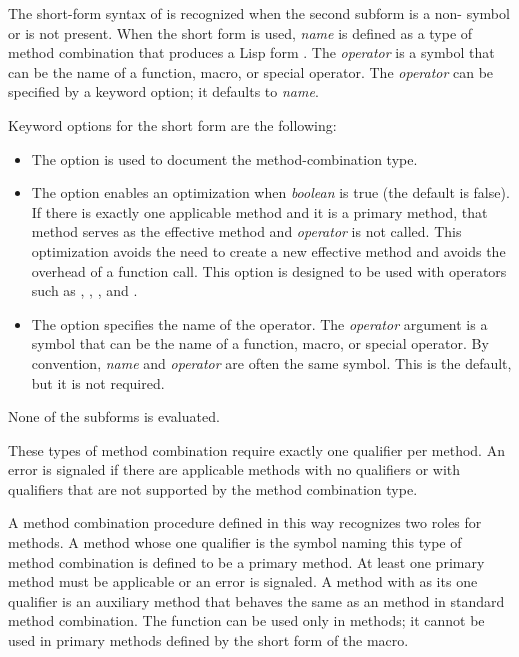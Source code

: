 \begin{defmac}
\medskip

The short-form syntax of  is recognized
when the second subform is a non- symbol or is not present.
When the short form is used, \emph{name\/} is defined as a type of
method combination that produces a Lisp form .  The \emph{operator\/} is a symbol
that can be the name of a function, macro, or special operator.  The
\emph{operator\/} can be specified by a keyword option; it defaults to {\it
name}.

Keyword options for the short form are the following:

\begin{itemize}

\item 
The  option is used to document the method-combination type.

\item 
The  option enables an optimization
when \emph{boolean\/} is true (the default is false).  If there is
exactly one applicable method and it is a primary method, that method
serves as the effective method and \emph{operator\/} is not called.
This optimization avoids the need to create a new effective method and
avoids the overhead of a function call.  This option is designed to be
used with operators such as , , \cdf{+}, and
.

\item 
The  option specifies the name of the operator.  The
\emph{operator\/} argument is a symbol that can be the name of a
function, macro, or special operator.  By convention, \emph{name\/} and
\emph{operator\/} are often the same symbol.  This is the default,
but it is not required.

\end{itemize}

None of the subforms is evaluated.

These types of method combination require exactly one qualifier per
method.  An error is signaled if there are applicable methods with no
qualifiers or with qualifiers that are not supported by the method
combination type. 

A method combination procedure defined in this way recognizes two
roles for methods.  A method whose one qualifier is the symbol naming
this type of method combination is defined to be a primary method.  At
least one primary method must be applicable or an error is signaled.
A method with  as its one qualifier is an auxiliary
method that behaves the same as an  method in standard
method combination.  The function  can be
used only in  methods; it cannot be used in primary methods
defined by the short form of the  macro.


\end{defmac}
